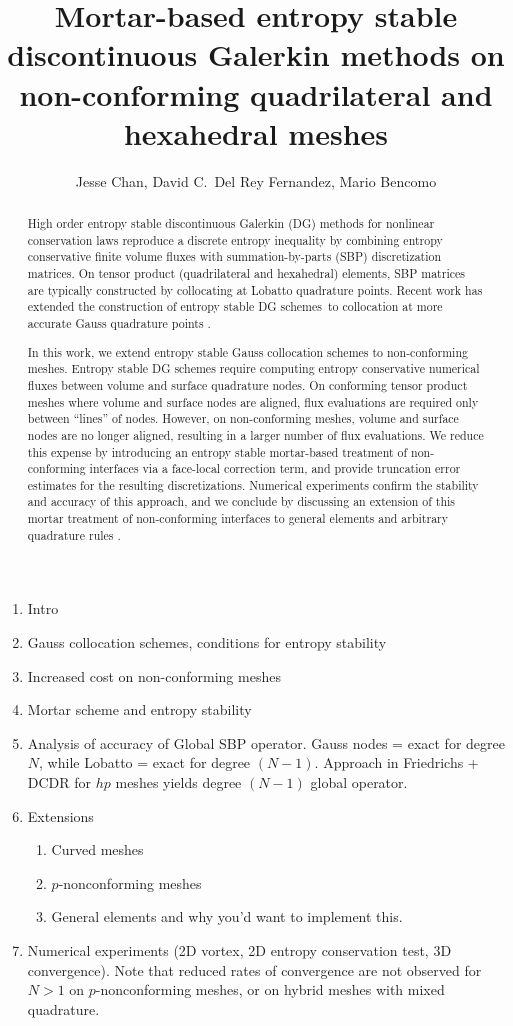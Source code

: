 \documentclass{svjour3}                     %
\date{}
\author{Jesse Chan, David C.\ Del Rey Fernandez, Mario Bencomo}
\title{Mortar-based entropy stable discontinuous Galerkin methods on non-conforming quadrilateral and hexahedral meshes}
\begin{document}
\maketitle

\begin{abstract}
High order entropy stable discontinuous Galerkin (DG) methods for nonlinear conservation laws reproduce a discrete entropy inequality by combining entropy conservative finite volume fluxes with summation-by-parts (SBP) discretization matrices.  On tensor product (quadrilateral and hexahedral) elements, SBP matrices are typically constructed by collocating at Lobatto quadrature points.  Recent work has extended the construction of entropy stable DG schemes to collocation at more accurate Gauss quadrature points \cite{chan2018efficient}.  

In this work, we extend entropy stable Gauss collocation schemes to non-conforming meshes.  Entropy stable DG schemes require computing entropy conservative numerical fluxes between volume and surface quadrature nodes.  On conforming tensor product meshes where volume and surface nodes are aligned, flux evaluations are required only between ``lines'' of nodes.  However, on non-conforming meshes, volume and surface nodes are no longer aligned, resulting in a larger number of flux evaluations.  We reduce this expense by introducing an entropy stable mortar-based treatment of non-conforming interfaces via a face-local correction term, and provide truncation error estimates for the resulting discretizations.  Numerical experiments confirm the stability and accuracy of this approach, and we conclude by discussing an extension of this mortar treatment of non-conforming interfaces to general elements and arbitrary quadrature rules \cite{chan2017discretely}.  
\end{abstract}

\begin{enumerate}
\item Intro
\item Gauss collocation schemes, conditions for entropy stability
\item Increased cost on non-conforming meshes
\item Mortar scheme and entropy stability
\item Analysis of accuracy of Global SBP operator.  Gauss nodes = exact for degree $N$, while Lobatto = exact for degree $(N-1)$.  Approach in Friedrichs + DCDR for $hp$ meshes yields degree $(N-1)$ global operator.
\item Extensions
\begin{enumerate}
\item Curved meshes
\item $p$-nonconforming meshes
\item General elements and why you'd want to implement this.
\end{enumerate}
\item Numerical experiments (2D vortex, 2D entropy conservation test, 3D convergence).  Note that reduced rates of convergence are not observed for $N>1$ on $p$-nonconforming meshes, or on hybrid meshes with mixed quadrature.
\end{enumerate}
\end{document}
